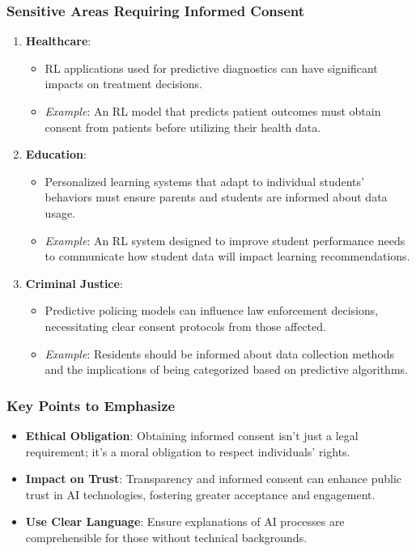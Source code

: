 \documentclass[aspectratio=169]{beamer}
\begin{document}
\begin{frame}[fragile]
    \frametitle{Sensitive Areas Requiring Informed Consent}
    \begin{enumerate}
        \item \textbf{Healthcare}: 
            \begin{itemize}
                \item RL applications used for predictive diagnostics can have significant impacts on treatment decisions. 
                \item \textit{Example}: An RL model that predicts patient outcomes must obtain consent from patients before utilizing their health data.
            \end{itemize}
        
        \item \textbf{Education}: 
            \begin{itemize}
                \item Personalized learning systems that adapt to individual students’ behaviors must ensure parents and students are informed about data usage.
                \item \textit{Example}: An RL system designed to improve student performance needs to communicate how student data will impact learning recommendations.
            \end{itemize}
        
        \item \textbf{Criminal Justice}:
            \begin{itemize}
                \item Predictive policing models can influence law enforcement decisions, necessitating clear consent protocols from those affected.
                \item \textit{Example}: Residents should be informed about data collection methods and the implications of being categorized based on predictive algorithms.
            \end{itemize}
    \end{enumerate}
\end{frame}

\begin{frame}[fragile]
    \frametitle{Key Points to Emphasize}
    \begin{itemize}
        \item \textbf{Ethical Obligation}: Obtaining informed consent isn't just a legal requirement; it's a moral obligation to respect individuals' rights.
        \item \textbf{Impact on Trust}: Transparency and informed consent can enhance public trust in AI technologies, fostering greater acceptance and engagement.
        \item \textbf{Use Clear Language}: Ensure explanations of AI processes are comprehensible for those without technical backgrounds.
    \end{itemize}
\end{frame}
\end{document}
